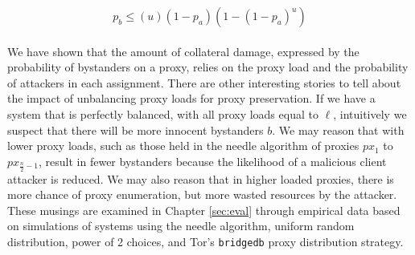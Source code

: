 $$p_b \leq (u)(1-p_a)(1-(1-p_a)^{u})$$\\

We have shown that the amount of collateral damage, expressed by the probability of bystanders on a proxy, relies on the proxy load and the probability of attackers in each assignment. There are other interesting stories to tell about the impact of unbalancing proxy loads for proxy preservation. If we have a system that is perfectly balanced, with all proxy loads equal to $\ell$, intuitively we suspect that there will be more innocent bystanders $b$. We may reason that with lower proxy loads, such as those held in the needle algorithm of proxies $px_1$ to $px_{\frac{n}{2}-1}$, result in fewer bystanders because the likelihood of a malicious client attacker is reduced. We may also reason that in higher loaded proxies, there is more chance of proxy enumeration, but more wasted resources by the attacker. These musings are examined in Chapter \ref{sec:eval} through empirical data based on simulations of systems using the needle algorithm, uniform random distribution, power of 2 choices, and Tor's \texttt{bridgedb} proxy distribution strategy. 